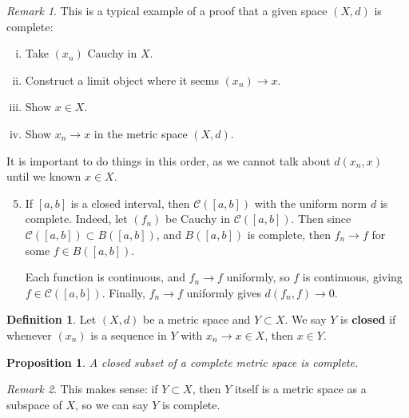 \documentclass[12pt]{article}
\newtheorem{proposition}{Proposition}[section]
\theoremstyle{definition}
\newtheorem{definition}{Definition}[section]
\theoremstyle{remark}
\newtheorem*{remark}{Remark}
\begin{document}
\begin{remark}
	This is a typical example of a proof that a given space $(X, d)$ is complete:
	\begin{enumerate}[(i)]
		\item Take $(x_n)$ Cauchy in $X$.
		\item Construct a limit object where it seems $(x_n) \to x$.
		\item Show $x \in X$.
		\item Show $x_n \to x$ in the metric space $(X, d)$.
	\end{enumerate}
	It is important to do things in this order, as we cannot talk about $d(x_n, x)$ until we known $x \in X$.
\end{remark}

\begin{adjustbox}{minipage = \columnwidth - 25.5pt, margin=1em, frame=1pt, margin=0em}
	\begin{enumerate}[1.]
		\setcounter{enumi}{4}
	\item If $[a, b]$ is a closed interval, then $\mathcal{C}([a, b])$ with the uniform norm $d$ is complete. Indeed, let $(f_n)$ be Cauchy in $\mathcal{C}([a, b])$. Then since $\mathcal{C}([a, b]) \subset B([a, b])$, and $B([a, b])$ is complete, then $f_n \to f$ for some $f \in B([a, b])$.

		Each function is continuous, and $f_n \to f$ uniformly, so $f$ is continuous, giving $f \in \mathcal{C}([a, b])$. Finally, $f_n \to f$ uniformly gives $d(f_n, f) \to 0$.
	\end{enumerate}
\end{adjustbox}

\begin{definition}
	Let $(X, d)$ be a metric space and $Y \subset X$. We say $Y$ is \textbf{closed} if whenever $(x_n)$ is a sequence in $Y$ with $x_n \to x \in X$, then $x \in Y$.
\end{definition}

\begin{proposition}
	A closed subset of a complete metric space is complete.
\end{proposition}

\begin{remark}
	This makes sense: if $Y \subset X$, then $Y$ itself is a metric space as a subspace of $X$, so we can say $Y$ is complete.
\end{remark}
\end{document}
